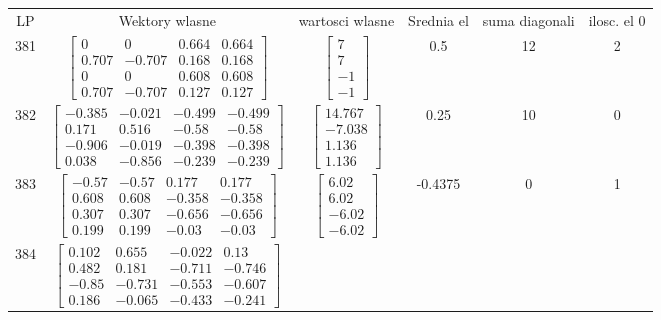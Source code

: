 \documentclass[a4paper,12pt]{article}
\begin{document}
\bgroup {} \vspace{0.2in} \begin{tabular}{c c c c c c}
LP &Wektory wlasne & wartosci wlasne & Srednia el & suma diagonali & ilosc. el 0\\
381
&
$\begin{bmatrix} 0 & 0 & 0.664 & 0.664 \\ 0.707 & -0.707 & 0.168 & 0.168 \\ 0 & 0 & 0.608 & 0.608 \\ 0.707 & -0.707 & 0.127 & 0.127 \end{bmatrix}$
&
$\begin{bmatrix} 7 \\ 7 \\ -1 \\ -1 \end{bmatrix}$
&
0.5
&
12
&
2
\\
382
&
$\begin{bmatrix} -0.385 & -0.021 & -0.499 & -0.499 \\ 0.171 & 0.516 & -0.58 & -0.58 \\ -0.906 & -0.019 & -0.398 & -0.398 \\ 0.038 & -0.856 & -0.239 & -0.239 \end{bmatrix}$
&
$\begin{bmatrix} 14.767 \\ -7.038 \\ 1.136 \\ 1.136 \end{bmatrix}$
&
0.25
&
10
&
0
\\
383
&
$\begin{bmatrix} -0.57 & -0.57 & 0.177 & 0.177 \\ 0.608 & 0.608 & -0.358 & -0.358 \\ 0.307 & 0.307 & -0.656 & -0.656 \\ 0.199 & 0.199 & -0.03 & -0.03 \end{bmatrix}$
&
$\begin{bmatrix} 6.02 \\ 6.02 \\ -6.02 \\ -6.02 \end{bmatrix}$
&
-0.4375
&
0
&
1
\\
384
&
$\begin{bmatrix} 0.102 & 0.655 & -0.022 & 0.13 \\ 0.482 & 0.181 & -0.711 & -0.746 \\ -0.85 & -0.731 & -0.553 & -0.607 \\ 0.186 & -0.065 & -0.433 & -0.241 \end{bmatrix}$

\end{tabular}
\end{document}
